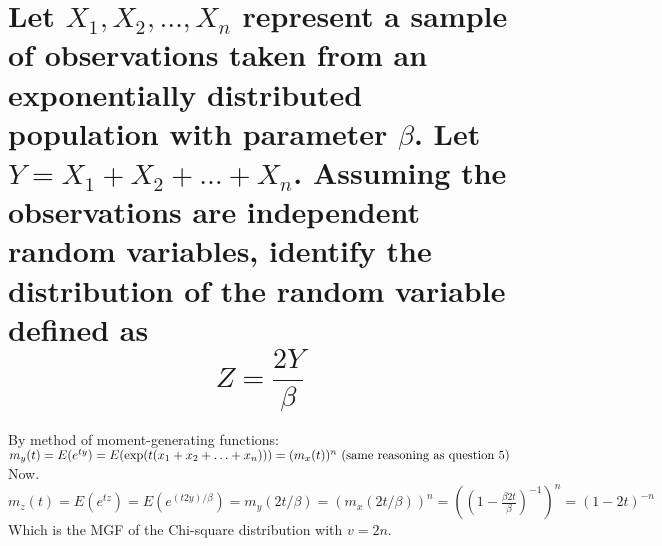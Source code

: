 \documentclass[10pt, letterpaper, titlepage]{article}
\begin{document}
    \newpage
    \section{Let $X_1 , X_2 , \hdots , X_n$ represent a sample of observations taken from an exponentially
        distributed population with parameter $\beta$. Let $Y = X_1 + X_2 + \hdots + X_n$. Assuming the
        observations are independent random variables, identify the distribution of the random
        variable defined as
        \[Z = \frac{2Y}{\beta}\]}
        By method of moment-generating functions: 
        \(
            m_{y}(t) = E(e^{t{y}}) = E(\exp(t (x_1 + x_2 + \hdots + x_n))) \\
            = (m_x(t))^{n} \text{ (same reasoning as question 5)}
        \)
        \\
        Now. \(
            m_z(t) = E(e^{tz}) = E(e^{(t 2 y) / \beta}) = m_y(2t/\beta) = (m_x(2t/\beta))^{n} 
            = ((1 - \frac{\beta 2 t}{\beta})^{-1})^{n} = (1 - 2t)^{-n}
        \)
        \\
        Which is the MGF of the Chi-square distribution with $v = 2n$.\\
        \begin{center}
        \end{center}
\end{document}
